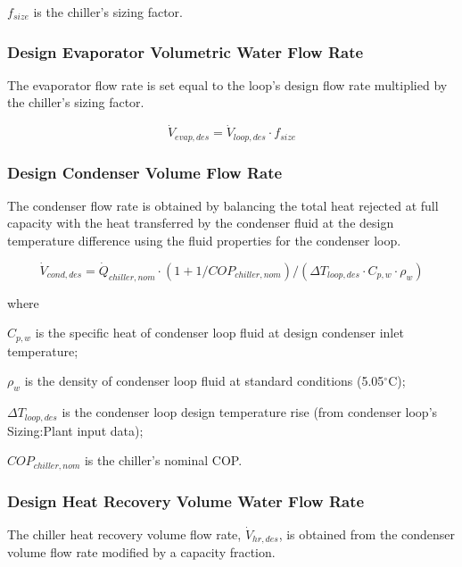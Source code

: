 \( f_{size} \) is the chiller's sizing factor.

\subsubsection{Design Evaporator Volumetric Water Flow Rate}\label{design-evaporator-volumetric-water-flow-rate}

The evaporator flow rate is set equal to the loop's design flow rate multiplied by the chiller's sizing factor.

\begin{equation}
\dot V_{evap,des} = \dot V_{loop,des} \cdot f_{size}
\end{equation}

\subsubsection{Design Condenser Volume Flow Rate}\label{design-condenser-volume-flow-rate}

The condenser flow rate is obtained by balancing the total heat rejected at full capacity with the heat transferred by the condenser fluid at the design temperature difference using the fluid properties for the condenser loop.

\begin{equation}
\dot V_{cond,des} = \dot Q_{chiller,nom} \cdot (1 + 1/COP_{chiller,nom})/(\Delta T_{loop,des} \cdot C_{p,w} \cdot \rho_w)
\end{equation}

where

\( C_{p,w} \) is the specific heat of condenser loop fluid at design condenser inlet temperature;

\( \rho_w \) is the density of condenser loop fluid at standard conditions (5.05\(^{\circ}\)C);

\( \Delta T_{loop,des} \) is the condenser loop design temperature rise (from condenser loop's Sizing:Plant input data);

\( COP_{chiller,nom} \) is the chiller's nominal COP.

\subsubsection{Design Heat Recovery Volume Water Flow Rate}\label{design-heat-recovery-chiller-volume-water-flow-rate}

The chiller heat recovery volume flow rate, \( \dot V_{hr,des} \), is obtained from the condenser volume flow rate modified by a capacity fraction.

